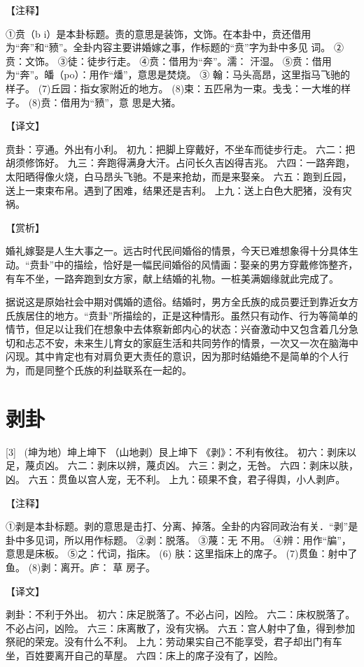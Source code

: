 \documentclass[12pt,UTF8]{ctexbook}
\begin{document}
【注释】

①贲（b i）是本卦标题。责的意思是装饰，文饰。在本卦中，贲还借用为“奔”和“豮”。全卦内容主要讲婚嫁之事，作标题的“贲”字为卦中多见 词。
②贲：文饰。
③徒：徒步行走。
④贲：借用为“奔”。濡： 汗湿。
⑤贲：借用为“奔”。皤（po）：用作“燔”，意思是焚烧。
③ 翰：马头高昂，这里指马飞驰的样子。
(7)丘园：指女家附近的地方。
(8)束：五匹帛为一束。戋戋：一大堆的样子。
(8)贲：借用为“豮”，意 思是大猪。

【译文】

贲卦：亨通。外出有小利。
初九：把脚上穿戴好，不坐车而徒步行走。
六二：把胡须修饰好。
九三：奔跑得满身大汗。占问长久吉凶得吉兆。
六四：一路奔跑，太阳晒得像火烧，白马昂头飞驰。不是来抢劫，而是来娶亲。
六五：跑到丘园，送上一束束布帛。遇到了困难，结果还是吉利。
上九：送上白色大肥猪，没有灾祸。

【赏析】

婚礼嫁娶是人生大事之一。远古时代民间婚俗的情景，今天已难想象得十分具体生动。“贲卦”中的描绘，恰好是一幅民间婚俗的风情画：娶亲的男方穿戴修饰整齐，有车不坐，一路奔跑到女方家，献上结婚的礼物。一桩美满姻缘就此完成了。

据说这是原始社会中期对偶婚的遗俗。结婚时，男方全氏族的成员要迁到靠近女方氏族居住的地方。“贲卦”所描绘的，正是这种情形。虽然只有动作、行为等简单的情节，但足以让我们在想象中去体察新郎内心的状态：兴奋激动中又包含着几分急切和忐忑不安，未来生儿育女的家庭生活和共同劳作的情景，一次又一次在脑海中闪现。其中肯定也有对肩负更大责任的意识，因为那时结婚绝不是简单的个人行为，而是同整个氏族的利益联系在一起的。


\chapter{剥卦}

[3] \ (坤为地）坤上坤下
（山地剥）艮上坤下
《剥》：不利有攸往。
初六：剥床以足，蔑贞凶。
六二：剥床以辨，蔑贞凶。
六三：剥之，无咎。
六四：剥床以肤，凶。
六五：贯鱼以宫人宠，无不利。
上九：硕果不食，君子得舆，小人剥庐。

【注释】

①剥是本卦标题。剥的意思是击打、分离、掉落。全卦的内容同政治有关．“剥”是卦中多见词，所以用作标题。
②剥：脱落。
③蔑：无 不用。
④辨：用作“牑”，意思是床板。
⑤之：代词，指床。
(6) 肤：这里指床上的席子。
(7)贯鱼：射中了鱼。
(8)剥：离开。庐： 草 房子。

【译文】

剥卦：不利于外出。
初六：床足脱落了。不必占问，凶险。
六二：床权脱落了。不必占问，凶险。
六三：床离散了，没有灾祸。
六五：宫人射中了鱼，得到参加祭祀的荣宠。没有什么不利。
上九：劳动果实自己不能享受，君子却出门有车坐，百姓要离开自己的草屋。
六四：床上的席子没有了，凶险。
\end{document}
